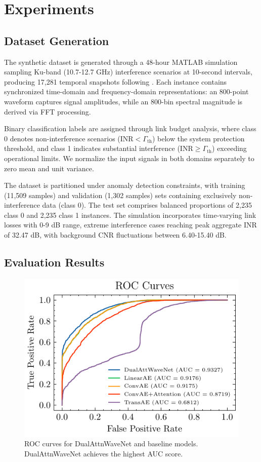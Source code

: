 \documentclass[conference]{IEEEtran}
\begin{document}
\section{Experiments}

\subsection{Dataset Generation}
\label{sec:dataset}

The synthetic dataset is generated through a 48-hour MATLAB simulation sampling Ku-band (10.7-12.7 GHz) interference scenarios at 10-second intervals, producing 17,281 temporal snapshots following \cite{saifaldawlaGenAIBasedModelsNGSO2024}. Each instance contains synchronized time-domain and frequency-domain representations: an 800-point waveform captures signal amplitudes, while an 800-bin spectral magnitude is derived via FFT processing.

Binary classification labels are assigned through link budget analysis, where class 0 denotes non-interference scenarios ($\text{INR} < \Gamma_{\text{th}}$) below the system protection threshold, and class 1 indicates substantial interference ($\text{INR} \geq \Gamma_{\text{th}}$) exceeding operational limits. We normalize the input signals in both domains separately to zero mean and unit variance.

The dataset is partitioned under anomaly detection constraints, with training (11,509 samples) and validation (1,302 samples) sets containing exclusively non-interference data (class 0). The test set comprises balanced proportions of 2,235 class 0 and 2,235 class 1 instances. The simulation incorporates time-varying link losses with 0-9 dB range, extreme interference cases reaching peak aggregate INR of 32.47 dB, with background CNR fluctuations between 6.40-15.40 dB.

\subsection{Evaluation Results}

\begin{figure}[t]
    \centering
    \includegraphics[width=0.8\linewidth]{roc-comparison.pdf}
    \caption{ROC curves for DualAttnWaveNet and baseline models. DualAttnWaveNet achieves the highest AUC score.}
    \label{fig:roc_comparison}
\end{figure}
\end{document}
